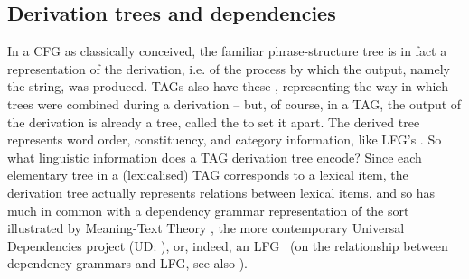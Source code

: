 \documentclass[output=paper,hidelinks]{langscibook}
\begin{document}



\subsection{Derivation trees and dependencies}\label{sec:TAG:dependencies}

In a CFG as classically conceived, the familiar phrase-structure tree is in fact
a representation of the derivation, i.e. of the process by which the output,
namely the string, was produced. TAGs also have these ,
representing the way in which trees were combined during a derivation -- but, of
course, in a TAG, the output of the derivation is already a tree, called the
 to set it apart. The derived tree represents word order,
constituency, and category information, like LFG's \cstruc. So what linguistic
information does a TAG derivation tree encode? Since each elementary tree in a
(lexicalised) TAG corresponds to a lexical item, the derivation tree actually
represents relations between lexical items, and so has much in common with a
dependency grammar representation of the sort illustrated by Meaning-Text Theory
\citep{Melcuk1988}, the more contemporary Universal Dependencies project (UD:
\citealp{UD}), or, indeed, an LFG \fstruc\ (on the relationship between
dependency grammars and LFG, see also ).
\end{document}

